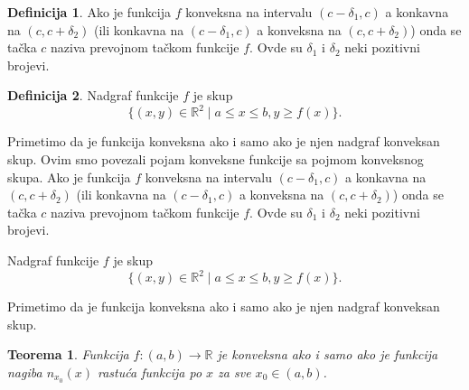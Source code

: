 \documentclass[a4paper,12pt]{article}
\theoremstyle{plain}
\newtheorem{theorem}{Teorema}[section]
\theoremstyle{definition}
\newtheorem{definition}{Definicija}[section]
\theoremstyle{remark}
\begin{document}
\begin{definition}
Ako je funkcija $f$ konveksna na intervalu $(c - \delta_1, c)$ a konkavna na $(c, c + \delta_2)$ (ili konkavna na $(c - \delta_1, c)$ a konveksna na $(c, c + \delta_2)$) onda se tačka $c$ naziva prevojnom tačkom funkcije $f$. Ovde su $\delta_1$ i $\delta_2$ neki pozitivni brojevi.
\end{definition}

\begin{definition}
Nadgraf funkcije $f$ je skup
$$
\{(x, y) \in \mathbb{R}^2 \mid a \leq x \leq b, y \geq f(x)\}.
$$

Primetimo da je funkcija konveksna ako i samo ako je njen nadgraf konveksan skup. Ovim smo povezali pojam konveksne funkcije sa pojmom konveksnog skupa.
Ako je funkcija $f$ konveksna na intervalu $(c - \delta_1, c)$ a konkavna na $(c, c + \delta_2)$ (ili konkavna na $(c - \delta_1, c)$ a konveksna na $(c, c + \delta_2)$) onda se tačka $c$ naziva prevojnom tačkom funkcije $f$. Ovde su $\delta_1$ i $\delta_2$ neki pozitivni brojevi.
\end{definition}

Nadgraf funkcije $f$ je skup
$$
\{(x, y) \in \mathbb{R}^2 \mid a \leq x \leq b, y \geq f(x)\}.
$$

Primetimo da je funkcija konveksna ako i samo ako je njen nadgraf konveksan skup.

\begin{theorem}
    \label{tvrdenje:48}
Funkcija $f: (a,b) \to \mathbb{R}$ je konveksna ako i samo ako je funkcija nagiba $n_{x_0}(x)$ rastuća funkcija po $x$ za sve $x_0 \in (a,b)$.
\end{theorem}
\end{document}

